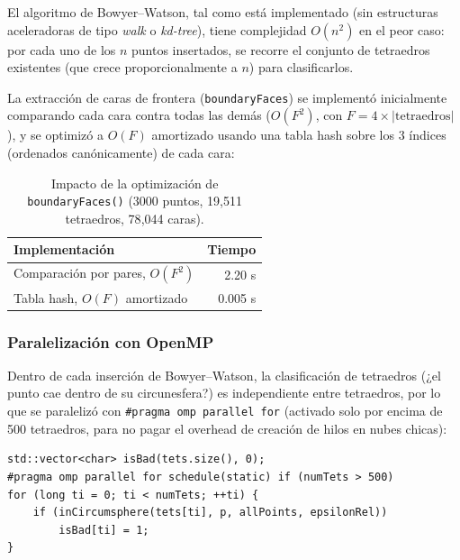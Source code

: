 \documentclass[12pt,a4paper]{article}
\begin{document}
El algoritmo de Bowyer--Watson, tal como está implementado (sin
estructuras aceleradoras de tipo \emph{walk} o \emph{kd-tree}), tiene
complejidad $O(n^2)$ en el peor caso: por cada uno de los $n$ puntos
insertados, se recorre el conjunto de tetraedros existentes (que crece
proporcionalmente a $n$) para clasificarlos.

La extracción de caras de frontera (\texttt{boundaryFaces}) se
implementó inicialmente comparando cada cara contra todas las demás
($O(F^2)$, con $F=4\times|\text{tetraedros}|$), y se optimizó a
$O(F)$ amortizado usando una tabla hash sobre los 3 índices (ordenados
canónicamente) de cada cara:

\begin{table}[H]
\centering
\caption{Impacto de la optimización de \texttt{boundaryFaces()} (3000 puntos, 19{,}511 tetraedros, 78{,}044 caras).}
\begin{tabular}{@{}lr@{}}
\toprule
\textbf{Implementación} & \textbf{Tiempo} \\
\midrule
Comparación por pares, $O(F^2)$ & 2.20 s \\
Tabla hash, $O(F)$ amortizado & 0.005 s \\
\bottomrule
\end{tabular}
\end{table}

\subsubsection{Paralelización con OpenMP}

Dentro de cada inserción de Bowyer--Watson, la clasificación de
tetraedros (¿el punto cae dentro de su circunesfera?) es independiente
entre tetraedros, por lo que se paralelizó con
\texttt{\#pragma omp parallel for} (activado solo por encima de 500
tetraedros, para no pagar el overhead de creación de hilos en nubes
chicas):

\begin{lstlisting}[caption={Clasificación de tetraedros paralelizada con OpenMP}]
std::vector<char> isBad(tets.size(), 0);
#pragma omp parallel for schedule(static) if (numTets > 500)
for (long ti = 0; ti < numTets; ++ti) {
    if (inCircumsphere(tets[ti], p, allPoints, epsilonRel))
        isBad[ti] = 1;
}
\end{lstlisting}
\end{document}
